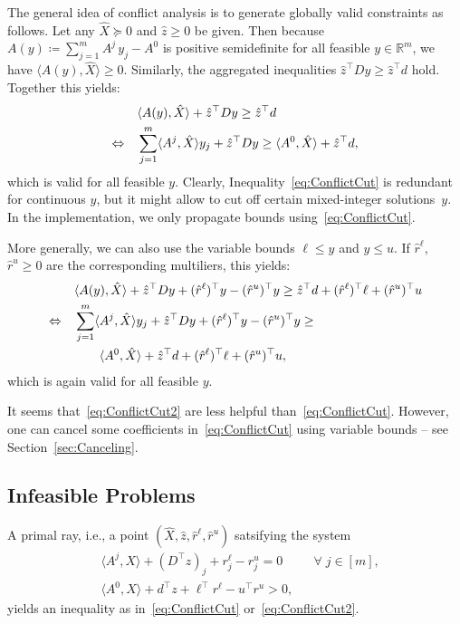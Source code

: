 \documentclass[10pt, a4paper]{article}
\newcommand{\define}{\coloneqq}
\newcommand{\skal}[2]{\langle{#1},{#2}\rangle}
\newcommand{\T}{^{\top}}
\newcommand{\R}{\mathds{R}}
\begin{document}
The general idea of conflict analysis is to generate globally valid
constraints as follows. Let any $\hat{X} \succeq 0$ and $\hat{z} \geq 0$ be
given. Then because $A(y) \define \sum_{j=1}^m A^j\, y_j - A^0$ is positive
semidefinite for all feasible $y \in \R^m$, we have
$\skal{A(y)}{\hat{X}} \geq 0$.  Similarly, the aggregated inequalities
$\hat{z}\T D y \geq \hat{z}\T d$ hold. Together this yields:
\begin{align}
  & \skal{A(y)}{\hat{X}} + \hat{z}\T D y \geq \hat{z}\T d\notag\\
  \Leftrightarrow\quad
  & \sum_{j=1}^m \skal{A^j}{\hat{X}} y_j + \hat{z}\T D y \geq
    \skal{A^0}{\hat{X}} + \hat{z}\T d,\label{eq:ConflictCut}
\end{align}
which is valid for all feasible $y$. Clearly,
Inequality~\eqref{eq:ConflictCut} is redundant for continuous $y$, but it
might allow to cut off certain mixed-integer solutions~$y$. In the implementation,
we only propagate bounds using~\eqref{eq:ConflictCut}.


More generally, we can also use the variable bounds $\ell \leq y$ and
$y \leq u$. If $\hat{r}^\ell$, $\hat{r}^u \geq 0$ are the corresponding
multiliers, this yields:
\begin{align}
  & \skal{A(y)}{\hat{X}} + \hat{z}\T D y + (\hat{r}^\ell)\T y - (\hat{r}^u)\T y
    \geq \hat{z}\T d + (\hat{r}^\ell)\T \ell + (\hat{r}^u)\T u\notag\\
  \Leftrightarrow\quad
  & \sum_{j=1}^m \skal{A^j}{\hat{X}} y_j + \hat{z}\T D y +
    (\hat{r}^\ell)\T y - (\hat{r}^u)\T y \geq \\
  & \qquad \skal{A^0}{\hat{X}} +
    \hat{z}\T d + (\hat{r}^\ell)\T \ell + (\hat{r}^u)\T u,\label{eq:ConflictCut2}
\end{align}
which is again valid for all feasible $y$.

It seems that~\eqref{eq:ConflictCut2} are less helpful
than~\eqref{eq:ConflictCut}. However, one can cancel some coefficients
in~\eqref{eq:ConflictCut} using variable bounds -- see
Section~\ref{sec:Canceling}.

\subsection{Infeasible Problems}

A primal ray, i.e., a point $(\hat{X}, \hat{z}, \hat{r}^\ell, \hat{r}^u)$
satsifying the system
\begin{equation}\label{eq:ray}
\begin{aligned}
  & \skal{A^j}{X} + (D\T z)_j + r^\ell_j - r^u_j = 0 && \forall\; j \in [m],\\
  & \skal{A^0}{X} + d\T z + \ell\T r^\ell - u\T r^u > 0,
\end{aligned}
\end{equation}
yields an inequality as in~\eqref{eq:ConflictCut}
or~\eqref{eq:ConflictCut2}.
\end{document}
